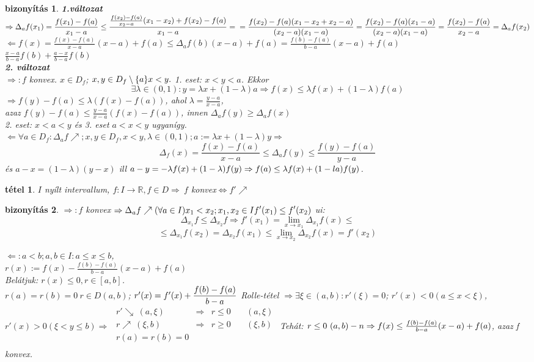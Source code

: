 \documentclass{article}
\newcommand{\fir}{f\colon I\rightarrow\mathbb{R}}
\newcommand{\ek}{\Longleftrightarrow}
\newcommand{\la}{\lambda}
\newcommand{\n}{\rightarrow}
\newcommand{\nn}{\Rightarrow}
\newcommand{\nb}{\Leftarrow}
\newcommand{\di}{\displaystyle}
\theoremstyle{magyar}
\newtheorem{te}{tétel}[section]
\newtheorem{bi}{bizonyítás}[section]
\begin{document}
  \begin{bi}
    \textbf{1.változat}\\
    $\nn\di\Delta_af(x_1)=\frac{f(x_1)-f(a)}{x_1-a}\le\frac{\frac{f(x_2)-f(a)}{x_2-a}(x_1-x_2)+f(x_2)-f(a)}{x_1-a}=\\=\frac{f(x_2)-f(a)(x_1-x_2+x_2-a)}{(x_2-a)(x_1-a)}=\frac{f(x_2)-f(a)(x_1-a)}{(x_2-a)(x_1-a)}=\frac{f(x_2)-f(a)}{x_2-a}=\Delta_af(x_2)$\\
    $\di\nb f(x)=\frac{f(x)-f(a)}{x-a}(x-a)+f(a)\le\Delta_af(b)(x-a)+f(a)=\frac{f(b)-f(a)}{b-a}(x-a)+f(a)$\\
    $\di\frac{x-a}{b-a}f(b)+\frac{a-x}{b-a}f(b)$\\
    \textbf{2. változat}\\
    $\nn: f$ konvex. $x\in D_f$; $x,y\in D_f\setminus\lbrace a\rbrace x<y.\\$ 1. eset: $x<y<a$. Ekkor \\
    \[\exists\la\in(0,1): y=\la x+(1-\la)a \nn f(x)\le\la f(x)+(1-\la)f(a)\] $\nn f(y)-f(a)\le\la(f(x)-f(a))$, ahol $\la=\frac{y-a}{x-a}$,\\azaz $f(y)-f(a) \le \frac{y-a}{x-a}(f(x)-f(a))$, innen $\Delta_af(y) \ge\Delta_af(x)$\\
    2. eset: $x<a<y$ és 3. eset $a<x<y$ ugyanígy.\\
    $\nb\forall a \in D_f: \Delta_af\nearrow; x,y\in D_f, x<y, \la\in (0,1); a:= \la x+(1-\la)y\nn$\[\Delta_f(x)=\frac{f(x)-f(a)}{x-a}\le\Delta_af(y)\le\frac{f(y)-f(a)}{y-a}\] és $a-x = (1-\la)(y-x)$ ill $a-y=-\la f(x)+(1-\la)f(y)\\\nn f(a)\le\la f(x)+(1-la)f(y)$.
  \end{bi}
  \begin{te}
    $I$ nyílt intervallum, $\fir,f\in D\nn\ f$ konvex$\ek f'\nearrow$
  \end{te}
  \begin{bi}
    $\nn:f$ konvex $\di\nn\Delta_af\nearrow (\forall a\in I)\\ x_1<x_2;x_1,x_2\in If'(x_1)\le f'(x_2) $
    ui:  \[\Delta_{x_1}f\le\Delta_{x_2}f\nn f'(x_1)=\lim_{x\n x_1}\Delta_{x_1}f(x)\le\]
    \[\le\Delta_{x_1}f(x_2)=\Delta_{x_2}f(x_1)\le\lim_{x\n x_2}\Delta_{x_2}f(x)=f'(x_2)\]
    
    $\nb:a<b;a,b\in I: a\le x\le b$,\\
    $r(x):=f(x)-\di\frac{f(b)-f(a)}{b-a}(x-a)+f(a)$\\
    Belátjuk: $r(x)\le0, r\in[a,b]$.\\
    $r(a)=r(b)=0\ r\in D(a,b)$;  $r'(x)=f'(x)+\di\frac{f(b)-f(a)}{b-a}\\$
    Rolle-tétel $\nn\exists \xi\in(a,b): r'(\xi)=0$; $r'(x)<0(a\le x<\xi)$, $r'(x)>0 (\xi<y\le b)\nn$
    $\begin{array}{ccccc}
      r'\searrow~(a,\xi)&\nn&r\le 0& ~&(a,\xi)\\
      r\nearrow~(\xi,b) &\nn&r\ge 0& ~&(\xi,b)\\
      r(a)=r(b)=0&~&~&~&~\\
    \end{array}$
    Tehát: $r\le 0 ~(a,b)-n\\\nn f(x)\le\frac{f(b)-f(a)}{b-a}(x-a)+f(a)$, azaz f konvex.
  \end{bi}
\end{document}
